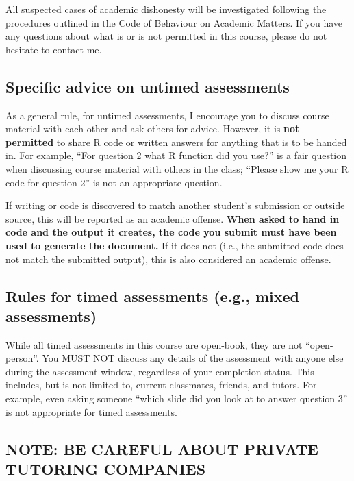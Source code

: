 \documentclass[
  openany]{book}
\begin{document}
All suspected cases of academic dishonesty will be investigated following the procedures outlined in the Code of Behaviour on Academic Matters. If you have any questions about what is or is not permitted in this course, please do not hesitate to contact me.

\hypertarget{specific-advice-on-untimed-assessments}{%
\subsection{Specific advice on untimed assessments}\label{specific-advice-on-untimed-assessments}}

As a general rule, for untimed assessments, I encourage you to discuss course material with each other and ask others for advice. However, it is \textbf{not permitted} to share R code or written answers for anything that is to be handed in. For example, ``For question 2 what R function did you use?'' is a fair question when discussing course material with others in the class; ``Please show me your R code for question 2'' is not an appropriate question.

If writing or code is discovered to match another student's submission or outside source, this will be reported as an academic offense. \textbf{When asked to hand in code and the output it creates, the code you submit must have been used to generate the document.} If it does not (i.e., the submitted code does not match the submitted output), this is also considered an academic offense.

\hypertarget{rules-for-timed-assessments-e.g.-mixed-assessments}{%
\subsection{Rules for timed assessments (e.g., mixed assessments)}\label{rules-for-timed-assessments-e.g.-mixed-assessments}}

While all timed assessments in this course are open-book, they are not ``open-person''. You MUST NOT discuss any details of the assessment with anyone else during the assessment window, regardless of your completion status. This includes, but is not limited to, current classmates, friends, and tutors. For example, even asking someone ``which slide did you look at to answer question 3'' is not appropriate for timed assessments.

\hypertarget{note-be-careful-about-private-tutoring-companies}{%
\subsection{NOTE: BE CAREFUL ABOUT PRIVATE TUTORING COMPANIES}\label{note-be-careful-about-private-tutoring-companies}}
\end{document}
